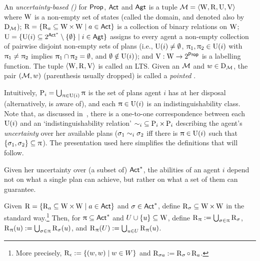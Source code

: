 \medskip

\begin{definition}\label{def:ults}
An \emph{uncertainty-based \lts (\ults)} for ${\rm \sf Prop}$, ${\rm \sf Act}$ and ${\rm \sf Agt}$ is a tuple $\mathcal{M} = \langle \operatorname{W},\operatorname{R},\operatorname{U},\operatorname{V} \rangle$ where $\operatorname{W}$ is a non-empty set of states (called the domain, and denoted also by $\operatorname{D}_{\mathcal{M}}$); $\operatorname{R} = \{ \operatorname{R}_a \subseteq \operatorname{W} \times \operatorname{W} \mid a \in {\rm \sf Act} \}$ is a collection of binary relations on $\operatorname{W}$; $\operatorname{U} = \{ \operatorname{U}(i) \subseteq 2^{{\rm \sf Act}^*}\setminus \{ \emptyset \} \mid i \in {\rm \sf Agt} \}$ assigns to every agent a non-empty collection of pairwise disjoint non-empty sets of plans (i.e., $\operatorname{U}(i) \neq \emptyset$, $\uppi_1, \uppi_2 \in \operatorname{U}(i)$ with $\uppi_1 \neq \uppi_2$ implies $\uppi_1 \cap \uppi_2 = \emptyset$, and $\emptyset \notin \operatorname{U}(i)$); and $\operatorname{V}:\operatorname{W} \to 2^{\rm \sf Prop}$ is a labelling function. The tuple $\langle \operatorname{W},\operatorname{R},\operatorname{V} \rangle$ is called an LTS. Given an \ults $\mathcal{M}$ and $w \in \operatorname{D}_{\mathcal{M}}$, the pair $(\mathcal{M},w)$ (parenthesis usually dropped) is called a \emph{pointed \ults}.
\end{definition}
\medskip


Intuitively, $\operatorname{P}_{i} = \bigcup_{\uppi \in \operatorname{U}(i)} \uppi$ is the set of plans agent $i$ has at her disposal (alternatively, is aware of), and each $\uppi \in \operatorname{U}(i)$ is an indistinguishability class. Note that, as discussed in~\cite{AFSVQ21}, there is a one-to-one correspondence between each $\operatorname{U}(i)$ and an `indistinguishability relation' ${\sim_i} \subseteq \operatorname{P}_{i} \times \operatorname{P}_{i}$ describing the agent's \emph{uncertainty} over her available plans ($\sigma_1 \sim_i \sigma_2$ iff there is $\uppi \in \operatorname{U}(i)$ such that $\{ \sigma_1, \sigma_2 \} \subseteq \uppi$). The presentation used here simplifies the definitions that will follow.

Given her uncertainty over (a subset of) ${\rm \sf Act}^*$, the abilities of an agent $i$ depend not on what a single plan can achieve, but rather on what a set of them can guarantee.

\medskip

\begin{definition}
Given $\operatorname{R}=\{ \operatorname{R}_a \subseteq \operatorname{W} \times \operatorname{W} \mid a\in{\rm \sf Act} \}$ and $\sigma \in {\rm \sf Act}^*$, define $\operatorname{R}_\sigma \subseteq \operatorname{W} \times \operatorname{W}$ in the standard way.\footnote{More precisely, $\operatorname{R}_\epsilon := \{ (w,w) \mid w \in W \}$ and $\operatorname{R}_{{\sigma}a} := \operatorname{R}_\sigma \circ \operatorname{R}_a$.} Then, for $\uppi \subseteq {\rm \sf Act}^*$ and $U \cup \{u \} \subseteq \operatorname{W}$, define $\operatorname{R}_\uppi := \bigcup_{\sigma \in \uppi} \operatorname{R}_{\sigma}$, $\operatorname{R}_{\uppi}(u) := \bigcup_{\sigma \in \uppi} \operatorname{R}_\sigma(u)$, and $\operatorname{R}_{\uppi}(U) := \bigcup_{u \in U} \operatorname{R}_{\uppi}(u)$.
\end{definition}

